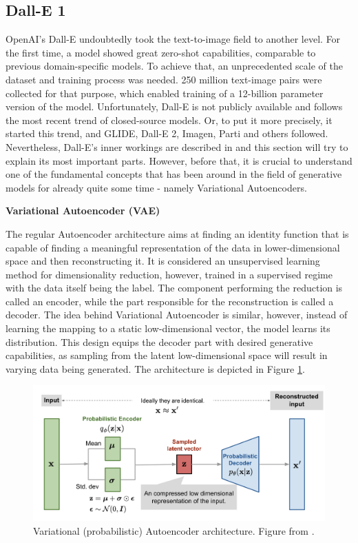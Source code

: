 \documentclass[
]{krantz}
\begin{document}
\hypertarget{dall-e-1}{%
\subsection{Dall-E 1}\label{dall-e-1}}

OpenAI's Dall-E undoubtedly took the text-to-image field to another level. For the first time, a model showed great zero-shot capabilities, comparable to previous domain-specific models. To achieve that, an unprecedented scale of the dataset and training process was needed. 250 million text-image pairs were collected for that purpose, which enabled training of a 12-billion parameter version of the model. Unfortunately, Dall-E is not publicly available and follows the most recent trend of closed-source models. Or, to put it more precisely, it started this trend, and GLIDE, Dall-E 2, Imagen, Parti and others followed. Nevertheless, Dall-E's inner workings are described in \citet{DALLE1} and this section will try to explain its most important parts. However, before that, it is crucial to understand one of the fundamental concepts that has been around in the field of generative models for already quite some time - namely Variational Autoencoders.

\textbf{Variational Autoencoder (VAE)}

The regular Autoencoder architecture aims at finding an identity function that is capable of finding a meaningful representation of the data in lower-dimensional space and then reconstructing it. It is considered an unsupervised learning method for dimensionality reduction, however, trained in a supervised regime with the data itself being the label. The component performing the reduction is called an encoder, while the part responsible for the reconstruction is called a decoder. The idea behind Variational Autoencoder \citep{VAE2013} is similar, however, instead of learning the mapping to a static low-dimensional vector, the model learns its distribution. This design equips the decoder part with desired generative capabilities, as sampling from the latent low-dimensional space will result in varying data being generated. The architecture is depicted in Figure \ref{fig:vae}.

\begin{figure}

{\centering \includegraphics[width=1\linewidth]{figures/02-02-text-2-img/vae} 

}

\caption{Variational (probabilistic) Autoencoder architecture. Figure from \citet{weng2018VAE}.}\label{fig:vae}
\end{figure}
\end{document}
